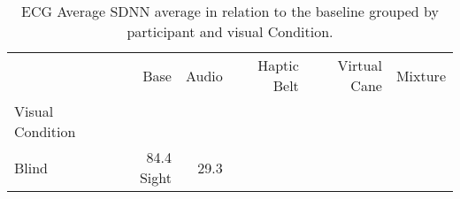 
\begin{table}[!htb]
\centering
\caption{ECG Average SDNN average in relation to the baseline grouped by participant and visual Condition.}
\label{tab:ecg_sdnn_average_group}
\begin{tabular}{lrrrrr}
\toprule
{} &   Base &  Audio & Haptic Belt & Virtual Cane & Mixture \\
Visual Condition &        &        &             &              &         \\
\midrule
Blind            &  84.4%
Sight            &  29.3%
\bottomrule
\end{tabular}
\end{table}

